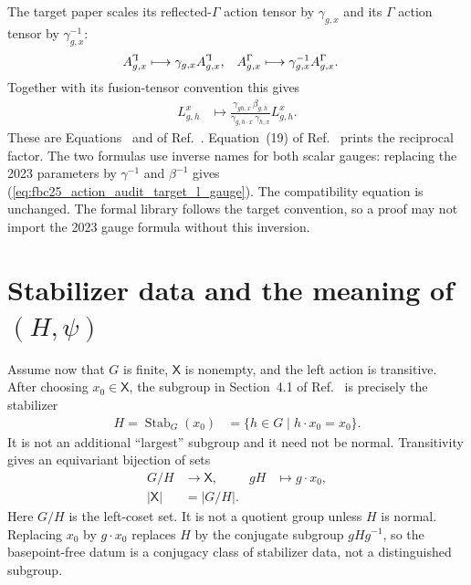 \documentclass{article}
\begin{document}
The target paper scales its reflected-$\Gamma$ action tensor by
$\gamma_{g,x}$ and its $\Gamma$ action tensor by $\gamma_{g,x}^{-1}$:
\begin{align}
    A^{\text{\reflectbox{$\Gamma$}}}_{g,x}
        &\longmapsto
          \gamma_{g,x}A^{\text{\reflectbox{$\Gamma$}}}_{g,x},
    &
    A^{\Gamma}_{g,x}
        &\longmapsto
          \gamma_{g,x}^{-1}A^{\Gamma}_{g,x}.
    \label{eq:fbc25_action_audit_action_tensor_gauge}
\end{align}
Together with its fusion-tensor convention this gives
\begin{align}
    L^x_{g,h}
        &\longmapsto
          \frac{\gamma_{gh,x}\,\beta_{g,h}}
               {\gamma_{g,h\mathbin{\cdot}x}\,\gamma_{h,x}}
          L^x_{g,h}.
    \label{eq:fbc25_action_audit_target_l_gauge}
\end{align}
These are Equations~ and
 of
Ref.~\cite[lines~1870--1919]{FrancoRubio2025MPUGauging}.
Equation~(19) of Ref.~\cite[source lines~720--726]{GarreRubio2023MPOSym}
prints the reciprocal factor.  The two formulas use inverse names for both
scalar gauges: replacing the 2023 parameters by
$\gamma^{-1}$ and $\beta^{-1}$ gives
(\ref{eq:fbc25_action_audit_target_l_gauge}).  The compatibility equation is
unchanged.  The formal library follows the target convention, so a proof may
not import the 2023 gauge formula without this inversion.

\section{Stabilizer data and the meaning of
  \texorpdfstring{$(H,\psi)$}{(H, psi)}}

Assume now that $G$ is finite, $\mathsf X$ is nonempty, and the left action is
transitive.  After choosing $x_0\in\mathsf X$, the subgroup in Section~4.1 of
Ref.~\cite[source lines~731--749]{GarreRubio2023MPOSym} is precisely the
stabilizer
\begin{align}
    H=\operatorname{Stab}_G(x_0)
        &=\{h\in G\mid h\mathbin{\cdot}x_0=x_0\}.
    \label{eq:fbc25_action_audit_stabilizer}
\end{align}
It is not an additional ``largest'' subgroup and it need not be normal.
Transitivity gives an equivariant bijection of sets
\begin{align}
    G/H&\longrightarrow\mathsf X,
    &gH&\longmapsto g\mathbin{\cdot}x_0,
    \label{eq:fbc25_action_audit_coset_equivalence}\\
    \lvert\mathsf X\rvert
        &=\lvert G/H\rvert.
    \label{eq:fbc25_action_audit_coset_cardinality}
\end{align}
Here $G/H$ is the left-coset set.  It is not a quotient group unless $H$ is
normal.  Replacing $x_0$ by $g\mathbin{\cdot}x_0$ replaces $H$ by the
conjugate subgroup $gHg^{-1}$, so the basepoint-free datum is a conjugacy
class of stabilizer data, not a distinguished subgroup.
\end{document}
